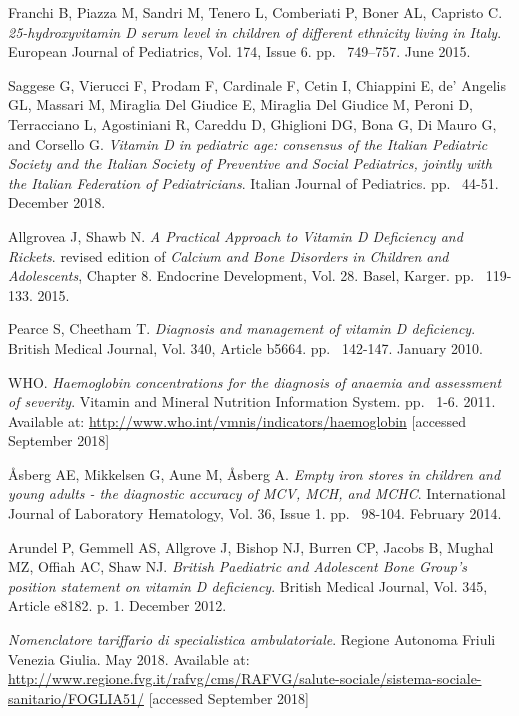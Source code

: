 \begin{thebibliography}{50}
  Franchi B, Piazza M, Sandri M, Tenero L, Comberiati P, Boner AL, Capristo C.
  \textit{25-hydroxyvitamin D serum level in children of different ethnicity living in Italy}.
  European Journal of Pediatrics, Vol. 174, Issue 6.
  pp. ~749–757.
  June 2015.
  
  Saggese G, Vierucci F, Prodam F, Cardinale F, Cetin I, Chiappini E, de’ Angelis GL, Massari M, Miraglia Del Giudice E, Miraglia Del Giudice M, Peroni D, Terracciano L, Agostiniani R, Careddu D, Ghiglioni DG, Bona G, Di Mauro G, and Corsello G.
  \textit{Vitamin D in pediatric age: consensus of the Italian Pediatric Society and the Italian Society of Preventive and Social Pediatrics, jointly with the Italian Federation of Pediatricians}.
  Italian Journal of Pediatrics.
  pp. ~44-51.
  December 2018.
  
  Allgrovea J, Shawb N.
  \textit{A Practical Approach to Vitamin D Deficiency and Rickets}.
   revised edition of \textit{Calcium and Bone Disorders in Children and Adolescents}, Chapter 8.
  Endocrine Development, Vol. 28.
  Basel, Karger.
  pp. ~119-133.
  2015.
  
  Pearce S, Cheetham T.
  \textit{Diagnosis and management of vitamin D deficiency}.
  British Medical Journal, Vol. 340, Article b5664.
  pp. ~142-147.
  January 2010.
  
  WHO.
  \textit{Haemoglobin concentrations for the diagnosis of anaemia and assessment of severity}.
  Vitamin and Mineral Nutrition Information System.
  pp. ~1-6.
  2011.
  Available at: \url{http://www.who.int/vmnis/indicators/haemoglobin} [accessed September 2018]
  
  Åsberg AE, Mikkelsen G, Aune M, Åsberg A.
  \textit{Empty iron stores in children and young adults - the diagnostic accuracy of MCV, MCH, and MCHC}.
  International Journal of Laboratory Hematology, Vol. 36, Issue 1.
  pp. ~98-104.
  February 2014.
  
  Arundel P, Gemmell AS, Allgrove J, Bishop NJ, Burren CP, Jacobs B, Mughal MZ, Offiah AC, Shaw NJ.
  \textit{British Paediatric and Adolescent Bone Group’s position statement on vitamin D deficiency}.
  British Medical Journal, Vol. 345, Article e8182.
  p. 1.
  December 2012.
  
  \textit{Nomenclatore tariffario di specialistica ambulatoriale}.
  Regione Autonoma Friuli Venezia Giulia.
  May 2018.
  Available at: \url{http://www.regione.fvg.it/rafvg/cms/RAFVG/salute-sociale/sistema-sociale-sanitario/FOGLIA51/} [accessed September 2018]

\end{thebibliography}